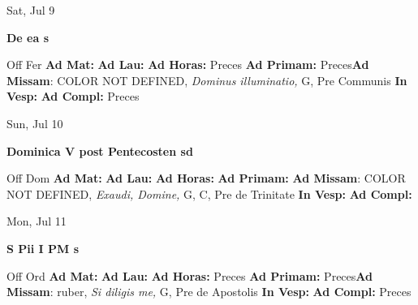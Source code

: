 \documentclass[10pt]{memoir}
\begin{document}
\begin{center}
\begin{minipage}{3.5in}
\vspace{2em}
\begin{center}Sat, Jul 9
\end{center}
\textbf{ \large De ea
\textnormal{\normalsize s}}

\begin{justify}Off Fer
\textbf{Ad Mat: }
\textbf{Ad Lau: }
\textbf{Ad Horas: }Preces
\textbf{Ad Primam: }Preces\textbf{Ad Missam}: COLOR NOT DEFINED, \textit{Dominus illuminatio,} G, Pre Communis
\textbf{In Vesp: }
\textbf{Ad Compl: }Preces
\end{justify}
\end{minipage}
\end{center}

\begin{center}
\begin{minipage}{3.5in}
\vspace{2em}
\begin{center}Sun, Jul 10
\end{center}
\textbf{ \large Dominica V post Pentecosten
\textnormal{\normalsize sd}}

\begin{justify}Off Dom
\textbf{Ad Mat: }
\textbf{Ad Lau: }
\textbf{Ad Horas: }
\textbf{Ad Primam: }\textbf{Ad Missam}: COLOR NOT DEFINED, \textit{Exaudi, Domine,} G, C, Pre de Trinitate
\textbf{In Vesp: }
\textbf{Ad Compl: }
\end{justify}
\end{minipage}
\end{center}

\begin{center}
\begin{minipage}{3.5in}
\vspace{2em}
\begin{center}Mon, Jul 11
\end{center}
\textbf{ \large S Pii I PM
\textnormal{\normalsize s}}

\begin{justify}Off Ord
\textbf{Ad Mat: }
\textbf{Ad Lau: }
\textbf{Ad Horas: }Preces
\textbf{Ad Primam: }Preces\textbf{Ad Missam}: ruber, \textit{Si diligis me,} G, Pre de Apostolis
\textbf{In Vesp: }
\textbf{Ad Compl: }Preces
\end{justify}
\end{minipage}
\end{center}
\end{document}
